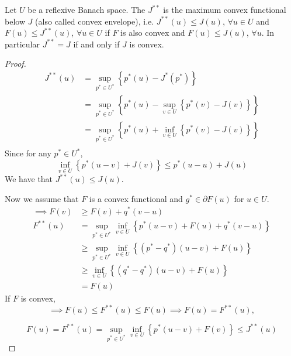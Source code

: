 \begin{theorem}
	Let $U$ be a reflexive Banach space. The $J^{**}$ is the maximum convex functional below $J$ (also called convex envelope), i.e. $J^{**}(u)\leq J(u)$, $\forall u \in U$ and $F(u)\leq J^{**}(u)$, $\forall u \in U$ if $F$ is also convex and $F(u)\leq J(u)$, $\forall u$. In particular $J^{**}=J$ if and only if $J$ is convex.
	\begin{proof}
		\begin{align}
			J^{**}(u)&=\sup_{p^*\in U^*} \left\lbrace p^*(u)-J^*(p^*) \right\rbrace\\
					&=\sup_{p^*\in U^*} \left\lbrace p^*(u)-\sup_{v\in U}\left\lbrace p^*(v)-J(v)\right\rbrace\right\rbrace\\
					&=\sup_{p^*\in U^*} \left\lbrace p^*(u)+\inf_{v\in U}\left\lbrace p^*(v)-J(v)\right\rbrace\right\rbrace\\
		\end{align}
		Since for any $p^* \in U^*$,
			\[
				\inf_{v\in U}\left\lbrace p^* \left(u-v\right)+J(v) \right\rbrace \leq p^*(u-u)+J(u)
			\]
		We have that $J^{**}(u)\leq J(u)$.
		
		Now we assume that $F$ is a convex functional and $g^* \in \partial F(u)$ for $u \in U$.
		\begin{align}
			\implies  F(v)&\geq F(v)+q^*(v-u)\\
					  F^{**}(u)& = \sup_{p^* \in U^*} \inf_{v \in U} \left\lbrace p^*(u-v)+F(u)+q^*(v-u)\right\rbrace \\
					  &\geq \sup_{p^* \in U^*} \inf_{v \in U} \left\lbrace \left(p^*-q^*\right)(u-v)+F(u)\right\rbrace\\
					  &\geq \inf_{v \in U} \left\lbrace (q^*-q^*)(u-v)+F(u) \right\rbrace\\
					  &=F(u)
		\end{align}
	If $F$ is convex,
	\begin{equation}
		\implies F(u)\leq F^{**}(u)\leq F(u) \implies F(u)=F^{**}(u),
	\end{equation}

	\begin{equation}
	F(u)=F^{**}(u)=\sup_{p^* \in U^*} \inf_{v \in U} \left\lbrace p^*(u-v)+F(v)\right\rbrace \leq J^{**}(u)
	\end{equation}
	\end{proof}
\end{theorem}
